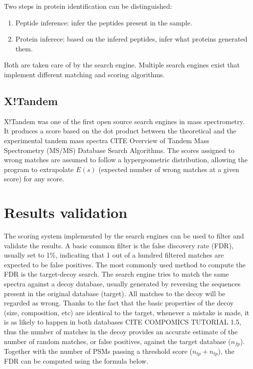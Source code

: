 \documentclass[11pt, a4paper]{report}
\begin{document}
Two steps in protein identification can be distinguished:

\begin{enumerate}

\item Peptide inference: infer the peptides present in the sample.
\item Protein inferece: based on the infered peptides, infer what proteins generated them.
\end{enumerate}

Both are taken care of by the search engine. Multiple search engines exist that implement different matching and scoring algorithms.

\subsection{X!Tandem}

X!Tandem was one of the first open source search engines in mass spectrometry. It produces a score based on the dot product between the theoretical and the experimental tandem mass spectra CITE Overview of Tandem Mass Spectrometry (MS/MS) Database Search Algorithms. The scores assigned to wrong matches are assumed to follow a hypergeometric distribution, allowing the program to extrapolate $E(s)$ (expected number of wrong matches at a given score) for any score.

\section{Results validation}

The scoring system implemented by the search engines can be used to filter and validate the results. A basic common filter is the false discovery rate (FDR), usually set to 1\%, indicating that 1 out of a hundred filtered matches are expected to be false positives. The most commonly used method to compute the FDR is the target-decoy search. The search engine tries to match the same spectra against a decoy database, usually generated by reversing the sequences present in the original database (target). All matches to the decoy will be regarded as wrong. Thanks to the fact that the basic properties of the decoy (size, composition, etc) are identical to the target, whenever a mistake is made, it is as likely to happen in both databases CITE COMPOMICS TUTORIAL 1.5, thus the number of matches in the decoy provides an accurate estimate of the number of random matches, or false positives, against the target database ($n_{fp}$). Together with the number of PSMs passing a threshold score ($n_{tp} + n_{tp}$), the FDR can be computed using the formula below.
\end{document}
